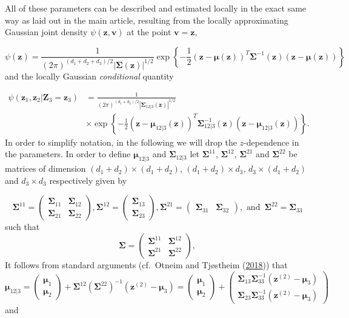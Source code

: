 \documentclass[
  12pt,
  letterpaper]{article}
\numberwithin{equation}{section}
\newcommand{\Z}{\bm{Z}}
\newcommand{\z}{\bm{z}}
\newcommand{\ztwo}{\bm{z}^{(2)}}
\newcommand{\fv}{\bm{v}}
\newcommand{\fmu}{\bm{\mu}}
\newcommand{\fSigma}{\bm{\Sigma}}
\begin{document}
All of these parameters can be described and estimated locally in the exact same way as laid out in the main article, resulting from the locally approximating Gaussian joint density \(\psi(\z,\fv)\) at the point \(\fv = \z\),

\begin{equation}
\psi(\z) = \frac{1}{(2\pi)^{(d_1+d_2+d_3)/2}|\fSigma(\z)|^{1/2}} \exp \left\{-\frac{1}{2}(\z - \fmu(\z))^T\fSigma^{-1}(\z)(\z - \fmu(\z))\right\}
\label{eq:localgaussian0}
\end{equation}
and the locally Gaussian \emph{conditional} quantity

\begin{align*}
\psi(\z_1, \z_2 | \Z_3 = \z_3) & = \frac{1}{(2\pi)^{(d_1+d_2)/2}|\fSigma_{12|3}(\z)|^{1/2}} \nonumber  \\ 
\qquad\qquad\qquad & \times \exp \left\{-\frac{1}{2}(\z - \fmu_{12|3}(\z))^T\fSigma_{12|3}^{-1}(\z)(\z - \fmu_{12|3}(\z))\right\}.
\end{align*}
In order to simplify notation, in the following we will drop the \(z\)-dependence in the parameters. In order to define \(\fmu_{12|3}\) and \(\fSigma_{12|3}\) let \(\fSigma^{11}\), \(\fSigma^{12}\), \(\fSigma^{21}\) and \(\fSigma^{22}\) be matrices of dimension \((d_1 + d_2) \times (d_1 + d_2)\), \((d_1 + d_2) \times d_3\), \(d_3 \times (d_1 + d_2)\) and \(d_3 \times d_3\) respectively given by

\[\fSigma^{11} = \begin{pmatrix} \fSigma_{11} & \fSigma_{12} \\ \fSigma_{21} & \fSigma_{22}\end{pmatrix}, \fSigma^{12} = \begin{pmatrix} \fSigma_{13} \\ \fSigma_{23}\end{pmatrix}, \fSigma^{21} = \begin{pmatrix} \fSigma_{31} & \fSigma_{32}\end{pmatrix}, \textrm{ and } \, \fSigma^{22} = \fSigma_{33}\]
such that
\[\fSigma = \begin{pmatrix} \fSigma^{11} & \fSigma^{12} \\ \fSigma^{21} & \fSigma^{22}\end{pmatrix},\]
It follows from standard arguments (cf.~Otneim and Tjøstheim (\protect\hyperlink{ref-otneim2017conditional}{2018})) that
\begin{equation}
\fmu_{12|3} = \begin{pmatrix} \fmu_1 \\ \fmu_2 \end{pmatrix} + \fSigma^{12}\left(\fSigma^{22}\right)^{-1}\left(\ztwo - \fmu_3\right) = \begin{pmatrix} \fmu_1 \\ \fmu_2 \end{pmatrix} + \begin{pmatrix} \fSigma_{13}\fSigma_{33}^{-1} \left(\ztwo - \fmu_3\right) \\  \fSigma_{23}\fSigma_{33}^{-1} \left(\ztwo - \fmu_3\right)\end{pmatrix}
\end{equation}
and
\end{document}
